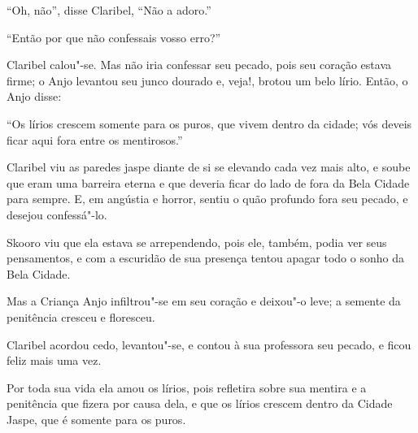 ``Oh, não'', disse Claribel, ``Não a adoro.''

``Então por que não confessais vosso erro?''

Claribel calou"-se. Mas não iria confessar seu pecado, pois seu
coração estava firme; o Anjo levantou seu junco dourado e, veja!, brotou
um belo lírio. Então, o Anjo disse:

``Os lírios crescem somente para os puros, que vivem dentro da cidade;
vós deveis ficar aqui fora entre os mentirosos.''

Claribel viu as paredes jaspe diante de si se elevando cada vez mais
alto, e soube que eram uma barreira eterna e que deveria
ficar do lado de fora da Bela Cidade para sempre. E, em angústia e horror,
sentiu o quão profundo fora seu pecado, e desejou confessá"-lo.

Skooro viu que ela estava se arrependendo, pois ele, também, podia ver
seus pensamentos, e com a escuridão de sua presença tentou apagar todo o
sonho da Bela Cidade.

Mas a Criança Anjo infiltrou"-se em seu coração e deixou"-o leve; a
semente da penitência cresceu e floresceu.

Claribel acordou cedo, levantou"-se, e contou à sua professora seu
pecado, e ficou feliz mais uma vez.

Por toda sua vida ela amou os lírios, pois refletira sobre sua mentira e
a penitência que fizera por causa dela, e que os lírios crescem dentro da Cidade
Jaspe, que é somente para os puros.


